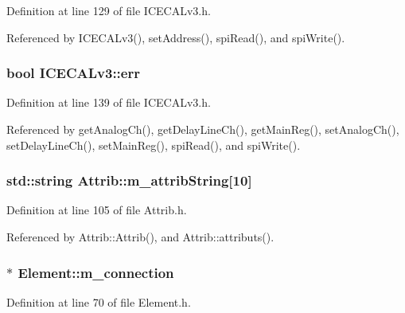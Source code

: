 Definition at line 129 of file ICECALv3.h.

Referenced by ICECALv3(), setAddress(), spiRead(), and spiWrite().\hypertarget{classICECALv3_ad8989925ee5b3ff322d863ce6aaff0bd}{
\subsubsection[{err}]{\setlength{\rightskip}{0pt plus 5cm}bool {\bf ICECALv3::err}}}
\label{classICECALv3_ad8989925ee5b3ff322d863ce6aaff0bd}


Definition at line 139 of file ICECALv3.h.

Referenced by getAnalogCh(), getDelayLineCh(), getMainReg(), setAnalogCh(), setDelayLineCh(), setMainReg(), spiRead(), and spiWrite().\hypertarget{classAttrib_a3414521d7a82476e874b25a5407b5e63}{
\subsubsection[{m\_\-attribString}]{\setlength{\rightskip}{0pt plus 5cm}std::string {\bf Attrib::m\_\-attribString}\mbox{[}10\mbox{]}}}
\label{classAttrib_a3414521d7a82476e874b25a5407b5e63}


Definition at line 105 of file Attrib.h.

Referenced by Attrib::Attrib(), and Attrib::attributs().\hypertarget{classElement_abe3de7a5dbbc9a6dd2d7e012e5fdb266}{
\subsubsection[{m\_\-connection}]{$\ast$ {\bf Element::m\_\-connection}}}
\label{classElement_abe3de7a5dbbc9a6dd2d7e012e5fdb266}


Definition at line 70 of file Element.h.


